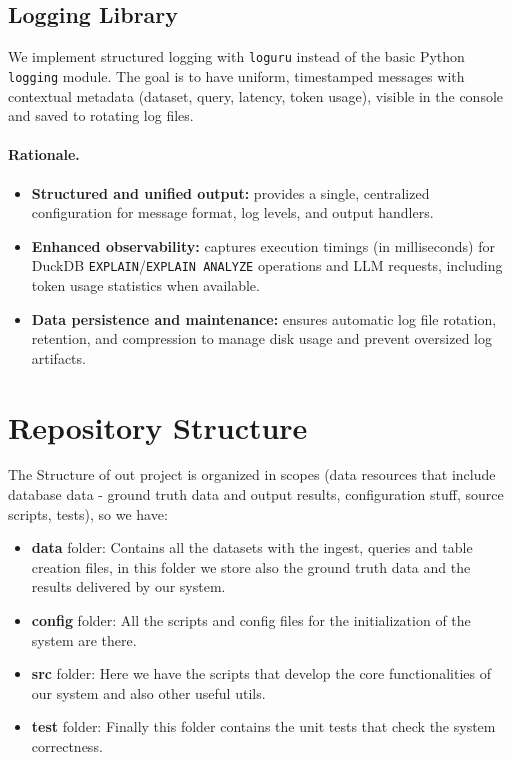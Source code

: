 \documentclass[12pt,a4paper]{article}
\begin{document}
\subsection{Logging Library}
\label{subsec:logging-library}
We implement structured logging with \texttt{loguru} instead of the basic Python \texttt{logging} module. 
The goal is to have uniform, timestamped messages with contextual metadata (dataset, query, latency, token usage), visible in the console and saved to rotating log files.
\paragraph{Rationale.}
\begin{itemize}
  \item \textbf{Structured and unified output:} provides a single, centralized configuration for message format, log levels, and output handlers.
  \item \textbf{Enhanced observability:} captures execution timings (in milliseconds) for DuckDB \texttt{EXPLAIN}/\texttt{EXPLAIN ANALYZE} operations and LLM requests, including token usage statistics when available.
  \item \textbf{Data persistence and maintenance:} ensures automatic log file rotation, retention, and compression to manage disk usage and prevent oversized log artifacts.
\end{itemize}


\section{Repository Structure}
The Structure of out project is organized in scopes (data resources that include database data - ground truth data and output results, configuration stuff,  source scripts, tests), so we have:\\
\begin{itemize}
    \item \textbf{data} folder: Contains all the datasets with the ingest, queries and table creation files, in this folder we store also the ground truth data and the results delivered by our system.
    \item \textbf{config} folder: All the scripts and config files for the initialization of the system are there.
    \item \textbf{src} folder: Here we have the scripts that develop the core functionalities of our system and also other useful utils. 
    \item \textbf{test} folder: Finally this folder contains the unit tests that check the system correctness.
\end{itemize}
\end{document}
